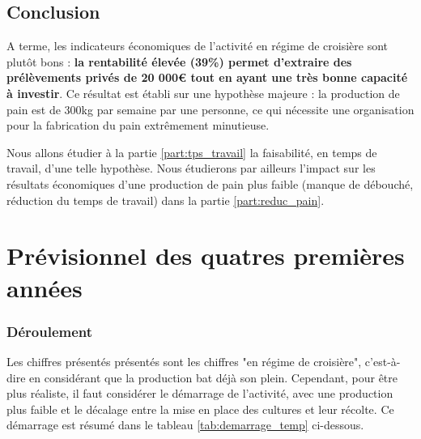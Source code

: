\documentclass{book}
\begin{document}
\noindent{}

\subsection{Conclusion}

A terme, les indicateurs économiques de l'activité en régime de croisière sont plutôt bons : \textbf{la rentabilité élevée (39\%) permet d'extraire des prélèvements privés de 20 000\euro{} tout en ayant une très bonne capacité à investir}. Ce résultat est établi sur une hypothèse majeure : la production de pain est de 300kg par semaine par une personne, ce qui nécessite une organisation pour la fabrication du pain extrêmement minutieuse. 

Nous allons étudier à la partie \ref{part:tps_travail} la faisabilité, en temps de travail, d'une telle hypothèse. Nous étudierons par ailleurs l'impact sur les résultats économiques d'une production de pain plus faible (manque de débouché, réduction du temps de travail) dans la partie \ref{part:reduc_pain}.

\section{Prévisionnel des quatres premières années}
\label{part:previsionnel}

\subsubsection{Déroulement}

Les chiffres présentés présentés sont les chiffres "en régime de croisière", c'est-à-dire en considérant que la production bat déjà son plein. Cependant, pour être plus réaliste, il faut considérer le démarrage de l'activité, avec une production plus faible et le décalage entre la mise en place des cultures et leur récolte. Ce démarrage est résumé dans le tableau \ref{tab:demarrage_temp} ci-dessous.
\end{document}
